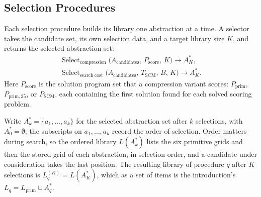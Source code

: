 \documentclass[10pt]{article}
\begin{document}
\subsection{Selection Procedures}

Each selection procedure builds its library one abstraction at a time. A
selector takes the candidate set, its own selection data, and a target
library size $K$, and returns the selected abstraction set:
\begin{gather*}
  \operatorname{Select}_{\mathrm{compression}}
    \bigl(A_{\mathrm{candidates}},\,P_{\mathrm{score}},\,K\bigr)
    \longrightarrow A^{*}_{K},\\
  \operatorname{Select}_{\mathrm{search\ cost}}
    \bigl(A_{\mathrm{candidates}},\,T_{\mathrm{SCM}},\,B,\,K\bigr)
    \longrightarrow A^{*}_{K}.
\end{gather*}
Here $P_{\mathrm{score}}$ is the solution program set that a compression
variant scores: $P_{\mathrm{prim}}$, $P_{\mathrm{prim,25}}$, or
$P_{\mathrm{SCM}}$, each containing the first solution found for each solved
scoring problem.

Write $A^{*}_{k}=\{a_1,\ldots,a_k\}$ for the selected abstraction set after
$k$ selections, with $A^{*}_{0}=\emptyset$; the subscripts on
$a_1,\ldots,a_k$ record the order of selection. Order matters during search,
so the ordered library $L(A^{*}_{k})$ lists the six primitive grids and then
the stored grid of each abstraction, in selection order, and a candidate
under consideration takes the last position. The resulting library of
procedure $q$ after $K$ selections is $L_q^{(K)}=L(A^{*}_{K})$, which as a
set of items is the introduction's $L_q=L_{\mathrm{prim}}\cup A^{*}_q$.
\end{document}
